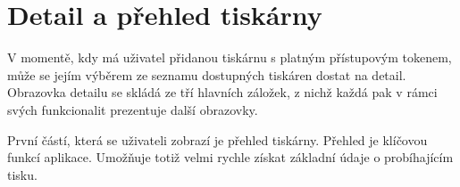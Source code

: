 \section{Detail a přehled tiskárny}

V momentě, kdy má uživatel přidanou tiskárnu s platným přístupovým tokenem, může se jejím výběrem ze seznamu dostupných tiskáren dostat na detail.
Obrazovka detailu se skládá ze tří hlavních záložek, z nichž každá pak v rámci svých funkcionalit prezentuje další obrazovky.

První částí, která se uživateli zobrazí je přehled tiskárny.
Přehled je klíčovou funkcí aplikace.
Umožňuje totiž velmi rychle získat základní údaje o probíhajícím tisku.
